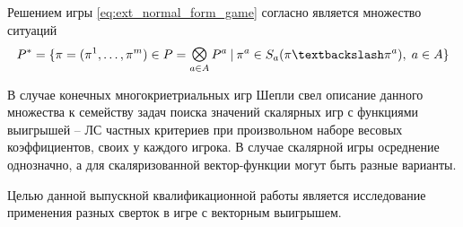 \begin{Def}
	Решением игры \eqref{eq:ext_normal_form_game} согласно \cite{blackwell} 
	является множество ситуаций 
	\begin{equation}
		P^* = \{ 
			\pi = (\pi^1, \ldots, \pi^m) \in P = \Motimes_{a \in A} P^a \: | \:
			\pi^a \in S_a(\pi \textbackslash \pi^a), \; a \in A
		\}
		\label{eq:game_solution}
	\end{equation}
\end{Def}

В случае конечных многокриетриальных игр Шепли свел \cite{shapley}
описание данного множества к семейству задач поиска значений 
скалярных игр с 
функциями выигрышей -- ЛС частных критериев при произвольном наборе
весовых коэффициентов, своих у каждого игрока.
В случае скалярной игры осреднение однозначно, а  для скаляризованной
вектор-функции могут быть разные варианты.

Целью данной выпускной квалификационной работы является исследование 
применения разных сверток в игре с векторным выигрышем.
